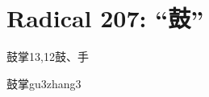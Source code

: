 
\section*{Radical 207: ``⿎''}

\begin{entry}{鼓掌}{13,12}{⿎、⼿}
  \begin{phonetics}{鼓掌}{gu3zhang3}
  \end{phonetics}
\end{entry}


